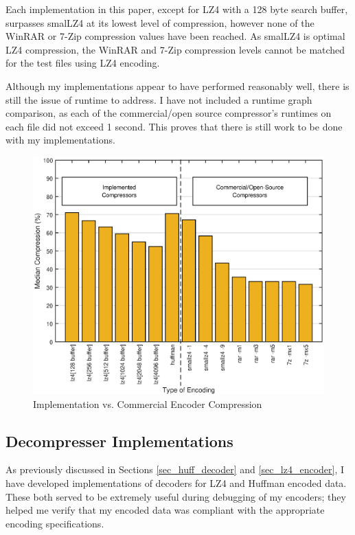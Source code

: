 \documentclass[12pt]{article}
\begin{document}
Each implementation in this paper, except for LZ4 with a 128 byte search buffer, surpasses smalLZ4 at its lowest level of compression, however none of the WinRAR or 7-Zip compression values have been reached. As smalLZ4 is optimal LZ4 compression, the WinRAR and 7-Zip compression levels cannot be matched for the test files using LZ4 encoding.

Although my implementations appear to have performed reasonably well, there is still the issue of runtime to address. I have not included a runtime graph comparison, as each of the commercial/open source compressor's runtimes on each file did not exceed 1 second. This proves that there is still work to be done with my implementations.

\begin{figure}[H]
	\centering
	\includegraphics[width=\textwidth]{commercial_comparison}
	\caption{Implementation vs. Commercial Encoder Compression}
	\label{fig:commercial_comparison}
\end{figure}

\subsection{Decompresser Implementations}
As previously discussed in Sections \ref{sec_huff_decoder} and \ref{sec_lz4_encoder}, I have developed implementations of decoders for LZ4 and Huffman encoded data. These both served to be extremely useful during debugging of my encoders; they helped me verify that my encoded data was compliant with the appropriate encoding specifications.
\end{document}
